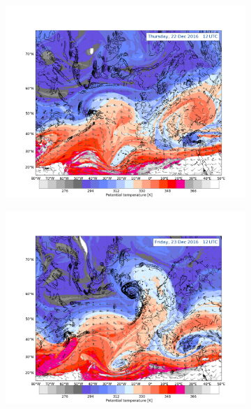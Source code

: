 \begin{figure}[h!]
\begin{subfigure}[b]{0.49\textwidth}
	\includegraphics[trim={4.2cm 3.9cm 4.3cm 5.1cm},clip,
	width=\textwidth]{./fig_DynTropo/20161222_12}
	\caption{}\label{fig:DT22}
\end{subfigure}
\begin{subfigure}[b]{0.49\textwidth}
	\includegraphics[trim={4.2cm 3.9cm 4.3cm 5.1cm},clip,
	width=\textwidth]{./fig_DynTropo/20161223_12}
	\caption{}\label{fig:DT23}
\end{subfigure}


\end{figure}
